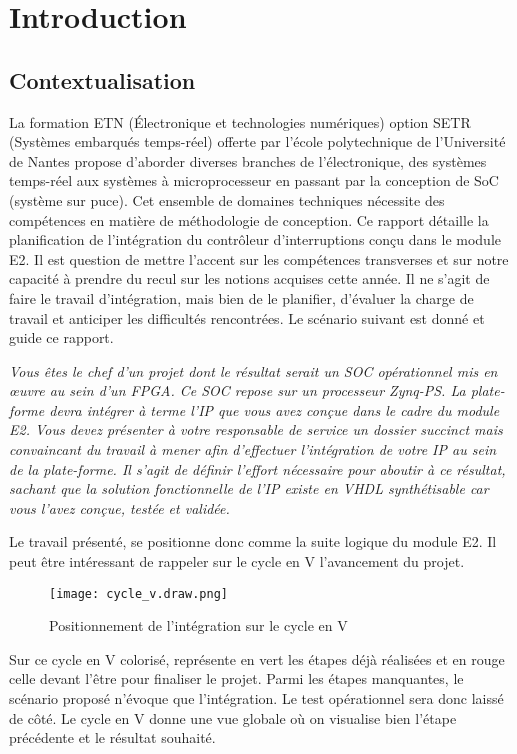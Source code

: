 \section{Introduction}

\subsection{Contextualisation}
La formation ETN (Électronique et technologies numériques) option SETR (Systèmes embarqués temps-réel) offerte par l'école polytechnique de l'Université de Nantes propose d'aborder diverses branches de l'électronique, des systèmes temps-réel aux systèmes à microprocesseur en passant par la conception de SoC (système sur puce). 
Cet ensemble de domaines techniques nécessite des compétences en matière de méthodologie de conception. 
Ce rapport détaille la planification de l'intégration du contrôleur d'interruptions conçu dans le module E2.
Il est question de mettre l'accent sur les compétences transverses et sur notre capacité à prendre du recul sur les notions acquises cette année.
Il ne s'agit de faire le travail d'intégration, mais bien de le planifier, d'évaluer la charge de travail et anticiper les difficultés rencontrées.
Le scénario suivant est donné et guide ce rapport.

\gap

\textit{ Vous êtes le chef d'un projet dont le résultat serait un SOC opérationnel mis en œuvre au sein d’un FPGA. 
Ce SOC repose sur un processeur Zynq-PS. 
La plate-forme devra intégrer à terme l'IP que vous avez conçue dans le cadre du module E2. 
Vous devez présenter à votre responsable de service un dossier succinct mais convaincant du travail à mener afin d’effectuer l’intégration de votre IP au sein de la plate-forme. 
Il s’agit de définir l'effort nécessaire pour aboutir à ce résultat, sachant que la solution fonctionnelle de l'IP existe en VHDL synthétisable car vous l'avez conçue, testée et validée.}

\gap

Le travail présenté, se positionne donc comme la suite logique du module E2.
Il peut être intéressant de rappeler sur le cycle en V l'avancement du projet.
\begin{figure}[H]
    \centering
    \texttt{[image: cycle\_v.draw.png]}
    \caption{Positionnement de l'intégration sur le cycle en V}
    \label{fig:cycle_v}
\end{figure}
Sur ce cycle en V colorisé, représente en vert les étapes déjà réalisées et en rouge celle devant l'être pour finaliser le projet.
Parmi les étapes manquantes, le scénario proposé n'évoque que l'intégration.
Le test opérationnel sera donc laissé de côté.
Le  cycle en V donne une vue globale où on visualise bien l'étape précédente et le résultat souhaité.



